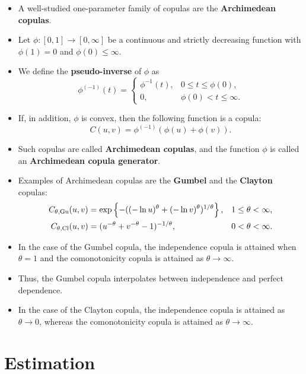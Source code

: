 \documentclass[square]{article} %
\theoremstyle{plain}
\theoremstyle{definition} %
\begin{document}
\begin{itemize}
\item A well-studied one-parameter family of copulas are the {\bf 
    Archimedean copulas}. 
\item Let $\phi:[0,1]\rightarrow[0,\infty]$ be a
  continuous and strictly decreasing function with $\phi(1)=0$ and
  $\phi(0)\leq\infty$.
\item  We define the {\bf pseudo-inverse} of $\phi$ as 
  \begin{equation*}
    \phi^{(-1)}(t)=
    \begin{cases}
      \phi^{-1}(t), &0\leq t\leq \phi(0),\\
      0, &\phi(0)<t\leq\infty.
    \end{cases}
  \end{equation*}
\item If, in addition, $\phi$ is convex, then the following function
  is a copula: 
  \begin{equation*}
    C(u,v)=\phi^{(-1)}(\phi(u)+\phi(v)).
  \end{equation*}
  \vspace*{-\baselineskip}
\item Such copulas are called {\bf Archimedean copulas}, and the
  function $\phi$ is called an {\bf Archimedean copula generator}. 
\item Examples of Archimedean copulas are the {\bf Gumbel} and the
  {\bf Clayton} copulas:
  \begin{align*}
    C_{\theta,{\rm Gu}}(u,v) &= \exp\left\{-((-\ln u)^\theta + (-\ln
                               v)^\theta)^{1/\theta}\right\},& 1\leq \theta<\infty,\\
    C_{\theta,{\rm Cl}}(u,v)&= (u^{-\theta} + v^{-\theta}
                              -1)^{-1/\theta}, & 0<\theta<\infty. 
  \end{align*}
\item In the case of the Gumbel copula, the independence copula is 
  attained when $\theta=1$ and the comonotonicity copula is attained
  as $\theta\rightarrow\infty$. 
\item Thus, the Gumbel copula interpolates between independence and
  perfect dependence.  
\item In the case of the Clayton copula, the independence copula is
  attained as $\theta\rightarrow 0$, whereas the comonotonicity
  copula is attained as $\theta\rightarrow\infty$. 
\end{itemize}


\section{Estimation}




\end{document}
